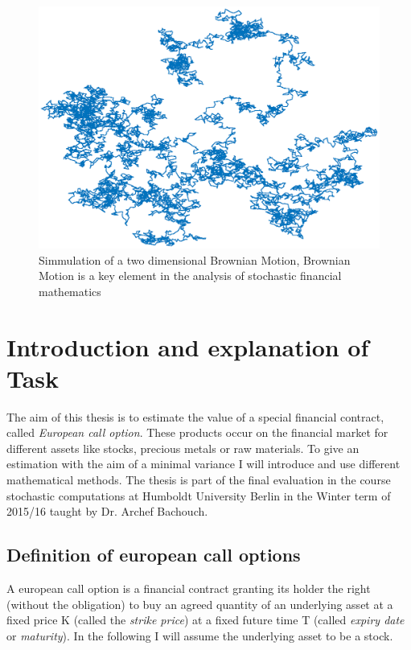 \documentclass[12pt,a4paper]{scrartcl}
\title{\ourTitle}
\author{Tim Jaschek}
\begin{document}
\begin{titlepage}
\maketitle

\begin{center}
\begin{figure}[h]
\includegraphics[scale=0.75]{images/BBB.eps} 
\caption{Simmulation of a two dimensional Brownian Motion, Brownian Motion is a key element in the analysis of stochastic financial mathematics}
\end{figure}
\end{center}

\thispagestyle{empty}

\end{titlepage}

\tableofcontents
\newpage

\section{Introduction and explanation of Task}
The aim of this thesis is to estimate the value of a special financial contract, called \emph{European call option}. These products occur on the financial market for different assets like stocks, precious metals or raw materials. To give an estimation with the aim of a minimal variance I will introduce and use different mathematical methods.
The thesis is part of the final evaluation in the course stochastic computations at Humboldt University Berlin in the Winter term of 2015/16 taught by Dr. Archef Bachouch.

\subsection{Definition of european call options}
A european call option is a financial contract granting its holder the right (without the obligation) to buy an agreed quantity of an underlying asset at a fixed price K (called the \emph{strike price}) at a fixed future time T (called \emph{expiry date} or \emph{maturity}). In the following I will assume the underlying asset to be a stock.
\end{document}
